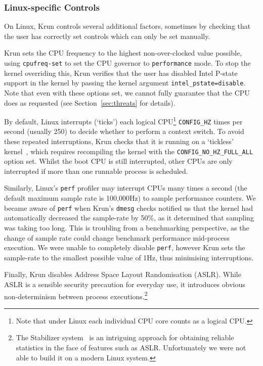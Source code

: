 \documentclass[preprint,numbers,10pt]{sigplanconf}
\newcommand{\krun}{Krun\xspace}
\begin{document}
\subsubsection{Linux-specific Controls}

On Linux, \krun controls several additional factors, sometimes by checking that
the user has correctly set controls which can only be set manually.

\krun sets the CPU frequency to the highest non-over-clocked value possible,
using \texttt{cpufreq-set} to set the CPU governor to \texttt{performance} mode.
To stop the kernel overriding this, \krun verifies that the user has disabled
Intel P-state support in the kernel by passing the kernel argument
\texttt{intel\_pstate=disable}. Note that even with these options set, we cannot
fully guarantee that the CPU does as requested
(see Section~\ref{sec:threats} for details).

By default, Linux interrupts (`ticks') each logical CPU\footnote{Note that
under Linux each individual CPU core counts as a logical CPU.}
\texttt{CONFIG\_HZ} times per second (usually 250) to
decide whether to perform a context switch. To avoid these repeated
interruptions, \krun checks that it is running on a `tickless'
kernel~\cite{tickless}, which requires recompiling the kernel with the
\texttt{CONFIG\_NO\_HZ\_FULL\_ALL} option set. Whilst the boot CPU is still
interrupted, other CPUs are only
interrupted if more than one runnable process is scheduled.

Similarly, Linux's \texttt{perf} profiler may interrupt CPUs many times a
second (the default maximum sample rate is 100,000Hz) to sample performance
counters. We became aware of \texttt{perf} when \krun's \texttt{dmesg} checks
notified us that the kernel had automatically decreased the sample-rate by
50\%,  as it determined that sampling was taking too long. This is troubling
from a benchmarking perspective, as the change of sample rate could change
benchmark performance mid-process execution. We were unable to completely
disable \texttt{perf}, however \krun sets the sample-rate to the smallest
possible value of 1Hz, thus minimising interruptions.

Finally, \krun disables Address Space Layout Randomisation (ASLR). While ASLR is
a sensible security precaution for everyday use, it introduces obvious
non-determinism between process executions.\footnote{The Stabilizer
system~\cite{curtsinger13stabilizer} is an intriguing approach for obtaining reliable
statistics in the face of features such as ASLR. Unfortunately we were not able
to build it on a modern Linux system.}
\end{document}
